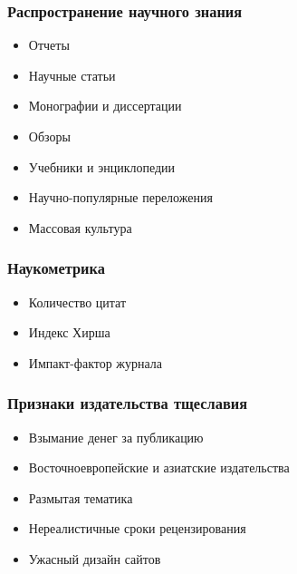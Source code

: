 \documentclass[aspectratio=169]{beamer}
\begin{document}
\begin{frame}\frametitle{Распространение научного знания}
\begin{itemize}
\item<+-> Отчеты
\item<+-> Научные статьи
\end{itemize}
\begin{itemize}
\item<+-> Монографии и диссертации
\item<+-> Обзоры
\item<+-> Учебники и энциклопедии
\end{itemize}
\begin{itemize}
\item<+-> Научно-популярные переложения
\item<+-> Массовая культура
\end{itemize}
\end{frame}

\begin{bframe}\frametitle{Наукометрика}
\begin{itemize}
\item Количество цитат
\item Индекс Хирша
\item Импакт-фактор журнала
\end{itemize}
\end{bframe}



\begin{bframe}\frametitle{Признаки издательства тщеславия}
\begin{itemize}
\item<+-> Взымание денег за публикацию
\item<+-> Восточноевропейские и азиатские издательства
\item<+-> Размытая тематика
\item<+-> Нереалистичные сроки рецензирования
\item<+-> Ужасный дизайн сайтов
\end{itemize}
\end{bframe}

\end{document}
